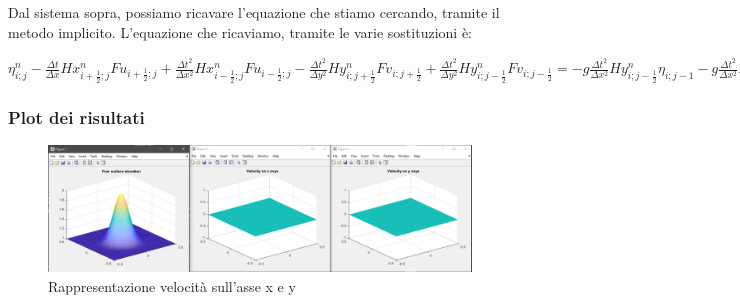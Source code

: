 \documentclass{beamer}
\begin{document}
\begin{frame}
	Dal sistema sopra, possiamo ricavare l'equazione che stiamo cercando, tramite il metodo implicito. 
	L'equazione che ricaviamo, tramite le varie sostituzioni è:
	
	$ \eta_{i;j}^{n} - \frac{\Delta t}{\Delta x}Hx_{i+\frac{1}{2};j}^{n} Fu_{i+\frac{1}{2};j} + \frac{\Delta t^{2}}{\Delta x^{2}}Hx_{i-\frac{1}{2};j}^{n} Fu_{i-\frac{1}{2};j} -\frac{\Delta t^{2}}{\Delta y^{2}}Hy_{i;j+\frac{1}{2}}^{n} Fv_{i;j+\frac{1}{2}}  + \frac{\Delta t^{2}}{\Delta y^{2}}Hy_{i;j-\frac{1}{2}}^{n} Fv_{i;j-\frac{1}{2}} = -g\frac{\Delta t^{2}}{\Delta x^{2}}Hy_{i;j-\frac{1}{2}}^{n} \eta_{i;j-1} -g\frac{\Delta t^{2}}{\Delta x^{2}}Hx_{i;j-\frac{1}{2}}^{n}  \eta_{i-1;j} + (1 + g(\frac{\Delta t^{2}}{\Delta x^{2}}Hx_{i+\frac{1}{2}; j}^{n} +\frac{\Delta t^{2}}{\Delta x^{2}}Hx_{i-\frac{1}{2}; j}^{n} + \frac{\Delta t^{2}}{\Delta y^{2}}Hy_{i;j+\frac{1}{2}}^{n} + \frac{\Delta t^{2}}{\Delta y^{2}}Hy_{i;j-\frac{1}{2}}^{n} ) )\eta_{i;j}^{n+1} - g\frac{\Delta t^{2}}{\Delta x^{2}}Hx_{i+;\frac{1}{2} ; j}^{n}  \eta_{i+1;j}^{n+1} - g\frac{\Delta t^{2}}{\Delta y^{2}}Hy_{i+;\frac{1}{2} ; j}^{n}  \eta_{i;j+1}^{n+1}	$
\end{frame}

\begin{frame}
	\frametitle{Plot dei risultati }
	
	\begin{figure}
		\includegraphics[width=1.0\linewidth]{test_2_cpu_matrice_120_120_0000_0000}
		\caption{Rappresentazione velocità sull'asse x e y}
		\label{fig:Rappresentazione velocità sull'asse x e y}
	\end{figure}
	
\end{frame}
\end{document}
